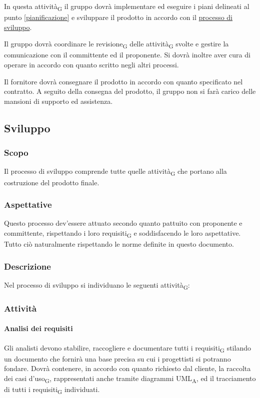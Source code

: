             In questa attività\textsubscript{G} il gruppo \group{} dovrà implementare ed eseguire i piani delineati al punto \ref{pianificazione} e sviluppare il prodotto in accordo con il \hyperref[sviluppo]{processo di sviluppo}.

            Il gruppo dovrà coordinare le revisione\textsubscript{G} delle attività\textsubscript{G} svolte e gestire la comunicazione con il committente ed il proponente. Si dovrà inoltre aver cura di operare in accordo con quanto scritto negli altri processi.


            Il fornitore dovrà consegnare il prodotto in accordo con quanto specificato nel contratto. A seguito della consegna del prodotto, il gruppo \group{}  non si farà carico delle mansioni di supporto ed assistenza.

\subsection{Sviluppo}
\label{sviluppo}
    \subsubsection{Scopo}
        Il processo di sviluppo comprende tutte quelle attività\textsubscript{G} che portano alla costruzione del prodotto finale.
    \subsubsection{Aspettative}
        Questo processo dev'essere attuato secondo quanto pattuito con proponente e committente, rispettando i loro requisiti\textsubscript{G} e soddisfacendo le loro aspettative. Tutto ciò naturalmente rispettando le norme definite in questo documento.
    \subsubsection{Descrizione}
        Nel processo di sviluppo si individuano  le seguenti attività\textsubscript{G}:

    \subsubsection{Attività}
        \paragraph{Analisi dei requisiti}
                Gli analisti devono stabilire, raccogliere e documentare tutti i requisiti\textsubscript{G} stilando un documento che fornirà una base precisa su cui i progettisti si potranno fondare. Dovrà contenere, in accordo con quanto richiesto dal cliente, la raccolta dei casi d'uso\textsubscript{G}, rappresentati anche tramite diagrammi UML\textsubscript{A}, ed il tracciamento di tutti i requisiti\textsubscript{G} individuati.

